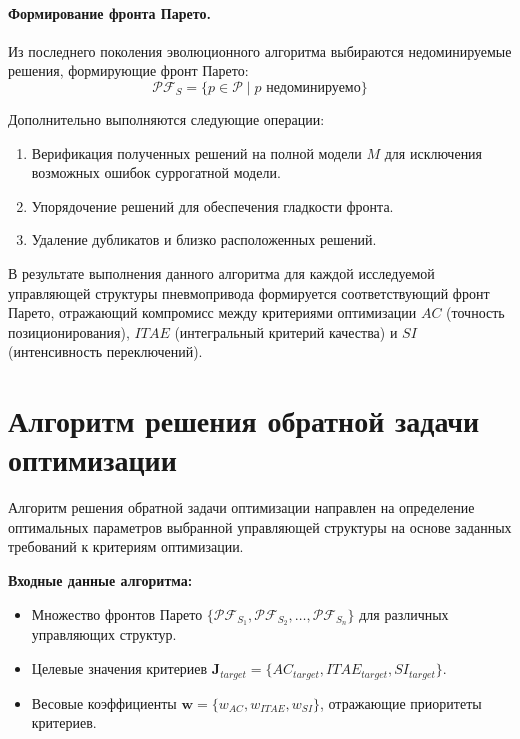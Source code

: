 \paragraph*{Формирование фронта Парето.}

Из последнего поколения эволюционного алгоритма выбираются
недоминируемые решения, формирующие фронт Парето:
\begin{equation}
    \mathcal{PF}_{S} = \{p \in \mathcal{P} \mid p \text{ недоминируемо}\}
\end{equation}

Дополнительно выполняются следующие операции:
\begin{enumerate}
    \item Верификация полученных решений на полной модели $M$ для исключения возможных ошибок суррогатной модели.
    \item Упорядочение решений для обеспечения гладкости фронта.
    \item Удаление дубликатов и близко расположенных решений.
\end{enumerate}

В результате выполнения данного алгоритма для каждой исследуемой управляющей
структуры пневмопривода формируется соответствующий фронт Парето, отражающий
компромисс между критериями оптимизации $AC$ (точность позиционирования), $ITAE$
(интегральный критерий качества) и $SI$ (интенсивность переключений).

\section*{Алгоритм решения обратной задачи оптимизации}

Алгоритм решения обратной задачи оптимизации направлен на определение
оптимальных параметров выбранной управляющей структуры на основе
заданных требований к критериям оптимизации.

\textbf{Входные данные алгоритма:}
\begin{itemize}
    \item Множество фронтов Парето $\{\mathcal{PF}_{S_1}, \mathcal{PF}_{S_2}, \ldots, \mathcal{PF}_{S_n}\}$ для различных управляющих структур.
    \item Целевые значения критериев $\mathbf{J}_{target} = \{AC_{target}, ITAE_{target}, SI_{target}\}$.
    \item Весовые коэффициенты $\mathbf{w} = \{w_{AC}, w_{ITAE}, w_{SI}\}$, отражающие приоритеты критериев.
\end{itemize}

